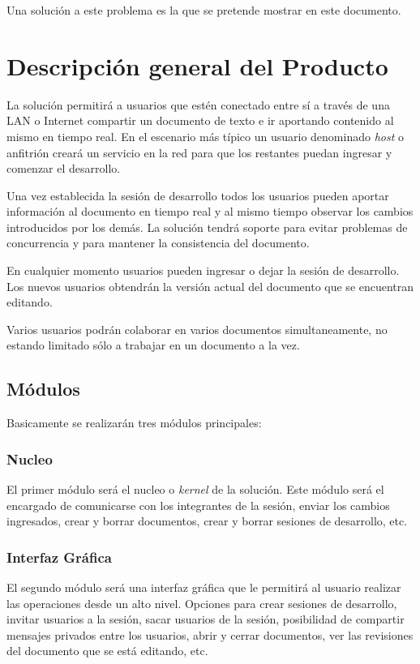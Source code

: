 \documentclass[a4paper,11pt]{article}
\begin{document}
		    Una soluci\'on a este problema es la que se pretende mostrar en este documento.

	\section{Descripci\'on general del Producto}
		La soluci\'on permitir\'a a usuarios que est\'en conectado entre s\'i a trav\'es de
		una LAN o Internet compartir un documento de texto e ir aportando contenido al mismo en
		tiempo real. En el escenario m\'as t\'ipico un usuario denominado \textit{host} o
		anfitri\'on crear\'a un servicio en la red para que los restantes puedan ingresar y
		comenzar el desarrollo.

		Una vez establecida la sesi\'on de desarrollo todos los usuarios pueden aportar
		informaci\'on al documento en tiempo real y al mismo tiempo observar los cambios
		introducidos por los dem\'as. La soluci\'on tendr\'a soporte para evitar problemas de
		concurrencia y para mantener la consistencia del documento.

	    En cualquier momento usuarios pueden ingresar o dejar la sesi\'on de desarrollo. Los
	    nuevos usuarios obtendr\'an la versi\'on actual del documento que se encuentran editando.

	    Varios usuarios podr\'an colaborar en varios documentos simultaneamente, no estando
	    limitado s\'olo a trabajar en un documento a la vez.

		\subsection{M\'odulos}
			Basicamente se realizar\'an tres m\'odulos principales:

				\subsubsection{Nucleo}
					El primer m\'odulo ser\'a el nucleo o \textit{kernel} de la soluci\'on.
					Este m\'odulo ser\'a el encargado de comunicarse con los integrantes de
					la sesi\'on, enviar los cambios ingresados, crear y borrar documentos,
					crear y borrar sesiones de desarrollo, etc.

				\subsubsection{Interfaz Gr\'afica}
					El segundo m\'odulo ser\'a una interfaz gr\'afica que le permitir\'a al
					usuario realizar las operaciones desde un alto nivel. Opciones para crear
					sesiones de desarrollo, invitar usuarios a la sesi\'on, sacar usuarios de
					la sesi\'on, posibilidad de compartir mensajes privados entre los usuarios,
					abrir y cerrar documentos, ver las revisiones del documento que se est\'a
					editando, etc.
\end{document}
